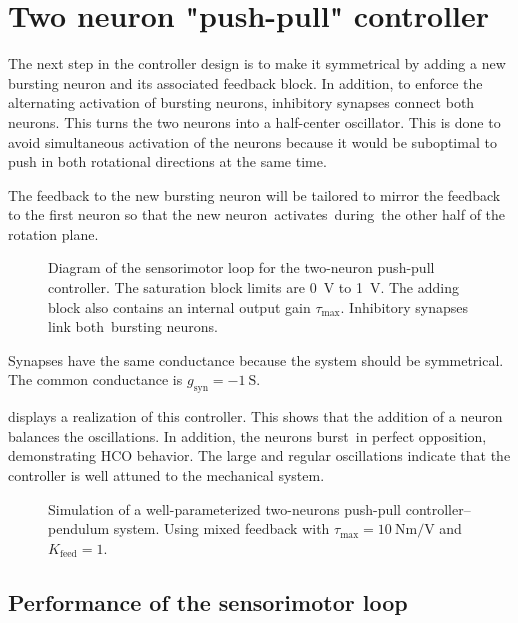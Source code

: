 \FloatBarrier
\section{Two neuron "push-pull" controller}\label{sec:two_neuron}

The next step in the controller design is to make it symmetrical by adding a new bursting neuron and its associated feedback block.
In addition, to enforce the alternating activation of bursting neurons, inhibitory synapses connect both neurons.
This turns the two neurons into a half-center oscillator.
This is done to avoid simultaneous activation of the neurons because it would be suboptimal to push in both rotational directions at the same time.

The feedback to the new bursting neuron will be tailored to mirror the feedback to the first neuron so that the new neuron activates during the other half of the rotation plane.

\begin{figure}[!htb]
    \centering
    \caption{Diagram of the sensorimotor loop for the two-neuron push-pull controller. The saturation block limits are \qty{0}{\volt} to \qty{1}{\volt}. The adding block also contains an internal output gain $\tau_\text{max}$. Inhibitory synapses link both bursting neurons.}
    \label{fig:two_motor}
\end{figure}

Synapses have the same conductance because the system should be symmetrical. The common conductance is $g_\text{syn} = \qty{-1}{\siemens}$.

 displays a realization of this controller. This shows that the addition of a neuron balances the oscillations. In addition, the neurons burst in perfect opposition, demonstrating HCO behavior. The large and regular oscillations indicate that the controller is well attuned to the mechanical system.

\begin{figure}[!htb]
    \centering
    \caption{Simulation of a well-parameterized two-neurons push-pull controller–pendulum system. Using mixed feedback with $\tau_\text{max}=\qty{10}{\newton\meter\per\volt}$ and $K_\text{feed} = 1$.}
    \label{fig:two_motor_demo}
\end{figure}

\subsection{Performance of the sensorimotor loop}

